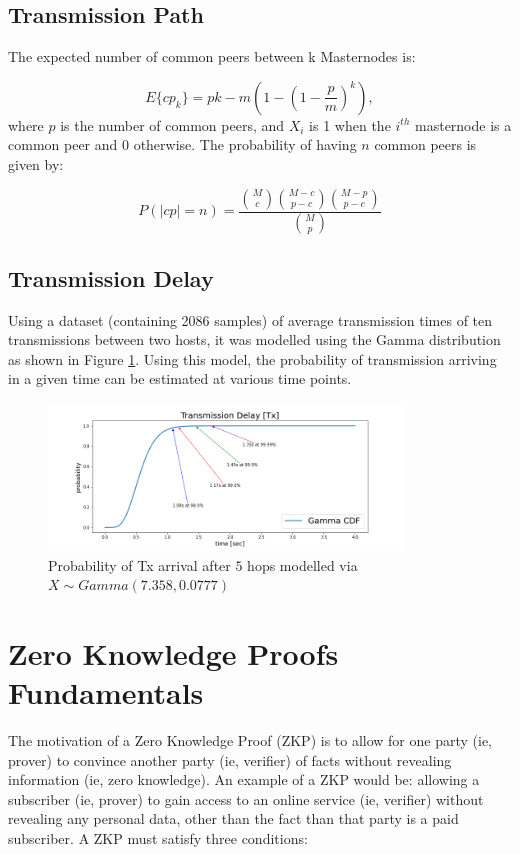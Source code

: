 \documentclass[peerreview]{ieeesyscoin}
\begin{document}
\subsection{Transmission Path}

The expected number of common peers between k Masternodes is:

\begin{equation}
E\{cp_{k}\} = pk -m \left(1 - \left(1 - \frac{p}{m}\right)^{k}\right),
\end{equation}
where $p$ is the number of common peers, and $X_{i}$ is 1 when the $i^{th}$ masternode is a common peer and 0 otherwise. The probability of having $n$ common peers is given by: 

\begin{equation}
P(|cp| = n) = \frac{\binom{M}{c} \binom{M-c}{p-c} \binom{M-p}{p-c} }{\binom{M}{p}}
\end{equation}

\subsection{Transmission Delay}

Using a dataset (containing 2086 samples) of average transmission times of ten transmissions between two hosts, it was modelled using the Gamma distribution as shown in Figure \ref{fig:tx_delay}. Using this model, the probability of transmission arriving in a given time can be estimated at various time points.

\begin{figure}[h!]
\includegraphics[width=3.7in]{img/transmission_delay.png}
\caption{Probability of Tx arrival after $5$ hops modelled via $X \sim Gamma(7.358,0.0777)$} 
\label{fig:tx_delay}
\end{figure} 

\section{Zero Knowledge Proofs Fundamentals}

The motivation of a Zero Knowledge Proof (ZKP) is to allow for one party (ie, prover) to convince another party (ie, verifier) of facts without revealing information (ie, zero knowledge). An example of a ZKP would be: allowing a subscriber (ie, prover) to gain access to an online service (ie, verifier) without revealing any personal data, other than the fact than that party is a paid subscriber. A ZKP must satisfy three conditions:
\end{document}
